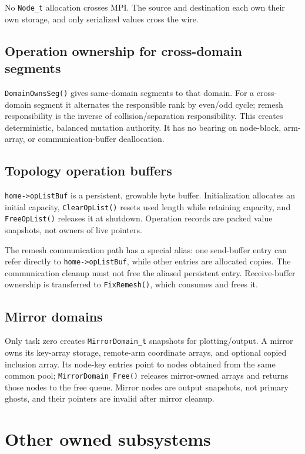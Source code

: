\documentclass[11pt]{article}
\newcommand{\code}[1]{\texorpdfstring{\nolinkurl{#1}}{#1}}
\begin{document}
No \code{Node_t} allocation crosses MPI.  The source and destination each own
their own storage, and only serialized values cross the wire.

\subsection{Operation ownership for cross-domain segments}

\code{DomainOwnsSeg()} gives same-domain segments to that domain.  For a
cross-domain segment it alternates the responsible rank by even/odd cycle;
remesh responsibility is the inverse of collision/separation responsibility.
This creates deterministic, balanced mutation authority.  It has no bearing
on node-block, arm-array, or communication-buffer deallocation.

\subsection{Topology operation buffers}

\code{home->opListBuf} is a persistent, growable byte buffer.  Initialization
allocates an initial capacity, \code{ClearOpList()} resets used length while
retaining capacity, and \code{FreeOpList()} releases it at shutdown.
Operation records are packed value snapshots, not owners of live pointers.

The remesh communication path has a special alias: one send-buffer entry can
refer directly to \code{home->opListBuf}, while other entries are allocated
copies.  The communication cleanup must not free the aliased persistent
entry.  Receive-buffer ownership is transferred to \code{FixRemesh()}, which
consumes and frees it.

\subsection{Mirror domains}

Only task zero creates \code{MirrorDomain_t} snapshots for plotting/output.
A mirror owns its key-array storage, remote-arm coordinate arrays, and optional
copied inclusion array.  Its node-key entries point to nodes obtained from the
same common pool; \code{MirrorDomain_Free()} releases mirror-owned arrays and
returns those nodes to the free queue.  Mirror nodes are output snapshots, not
primary ghosts, and their pointers are invalid after mirror cleanup.

\section{Other owned subsystems}
\end{document}
